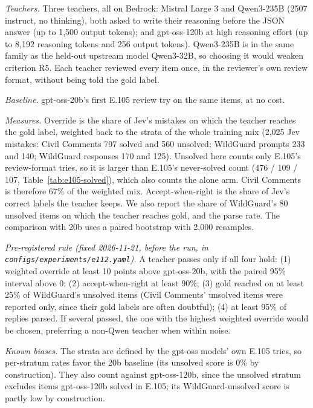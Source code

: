 \documentclass[11pt]{article}
\renewcommand{\_}{\origunderscore\allowbreak}
\begin{document}
\emph{Teachers.} Three teachers, all on Bedrock: Mistral Large 3 and Qwen3-235B (2507 instruct, no thinking), both asked to write their reasoning before the JSON answer (up to 1,500 output tokens); and gpt-oss-120b at high reasoning effort (up to 8,192 reasoning tokens and 256 output tokens). Qwen3-235B is in the same family as the held-out upstream model Qwen3-32B, so choosing it would weaken criterion R5. Each teacher reviewed every item once, in the reviewer's own review format, without being told the gold label.

\emph{Baseline.} gpt-oss-20b's first E.105 review try on the same items, at no cost.

\emph{Measures.} Override is the share of Jev's mistakes on which the teacher reaches the gold label, weighted back to the strata of the whole training mix (2,025 Jev mistakes: Civil Comments 797 solved and 560 unsolved; WildGuard prompts 233 and 140; WildGuard responses 170 and 125). Unsolved here counts only E.105's review-format tries, so it is larger than E.105's never-solved count (476 / 109 / 107, Table~\ref{tab:e105-solved}), which also counts the alone arm. Civil Comments is therefore 67\% of the weighted mix. Accept-when-right is the share of Jev's correct labels the teacher keeps. We also report the share of WildGuard's 80 unsolved items on which the teacher reaches gold, and the parse rate. The comparison with 20b uses a paired bootstrap with 2,000 resamples.

\emph{Pre-registered rule (fixed 2026-11-21, before the run, in \texttt{configs/experiments/e112.yaml}).} A teacher passes only if all four hold: (1) weighted override at least 10 points above gpt-oss-20b, with the paired 95\% interval above 0; (2) accept-when-right at least 90\%; (3) gold reached on at least 25\% of WildGuard's unsolved items (Civil Comments' unsolved items were reported only, since their gold labels are often doubtful); (4) at least 95\% of replies parsed. If several passed, the one with the highest weighted override would be chosen, preferring a non-Qwen teacher when within noise.

\emph{Known biases.} The strata are defined by the gpt-oss models' own E.105 tries, so per-stratum rates favor the 20b baseline (its unsolved score is 0\% by construction). They also count against gpt-oss-120b, since the unsolved stratum excludes items gpt-oss-120b solved in E.105; its WildGuard-unsolved score is partly low by construction.
\end{document}
